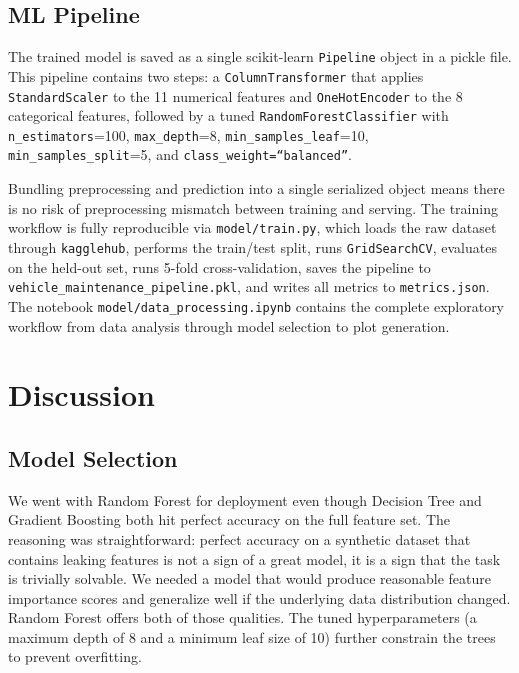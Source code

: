 \documentclass[conference]{IEEEtran}
\begin{document}
\subsection{ML Pipeline}

The trained model is saved as a single scikit-learn \texttt{Pipeline} object in a pickle file. This pipeline contains two steps: a \texttt{ColumnTransformer} that applies \texttt{StandardScaler} to the 11 numerical features and \texttt{OneHotEncoder} to the 8 categorical features, followed by a tuned \texttt{RandomForestClassifier} with \texttt{n\_estimators}=100, \texttt{max\_depth}=8, \texttt{min\_samples\_leaf}=10, \texttt{min\_samples\_split}=5, and \texttt{class\_weight=``balanced''}.

Bundling preprocessing and prediction into a single serialized object means there is no risk of preprocessing mismatch between training and serving. The training workflow is fully reproducible via \texttt{model/train.py}, which loads the raw dataset through \texttt{kagglehub}, performs the train/test split, runs \texttt{GridSearchCV}, evaluates on the held-out set, runs 5-fold cross-validation, saves the pipeline to \texttt{vehicle\_maintenance\_pipeline.pkl}, and writes all metrics to \texttt{metrics.json}. The notebook \texttt{model/data\_processing.ipynb} contains the complete exploratory workflow from data analysis through model selection to plot generation.

\section{Discussion}

\subsection{Model Selection}

We went with Random Forest for deployment even though Decision Tree and Gradient Boosting both hit perfect accuracy on the full feature set. The reasoning was straightforward: perfect accuracy on a synthetic dataset that contains leaking features is not a sign of a great model, it is a sign that the task is trivially solvable. We needed a model that would produce reasonable feature importance scores and generalize well if the underlying data distribution changed. Random Forest offers both of those qualities. The tuned hyperparameters (a maximum depth of 8 and a minimum leaf size of 10) further constrain the trees to prevent overfitting.
\end{document}
